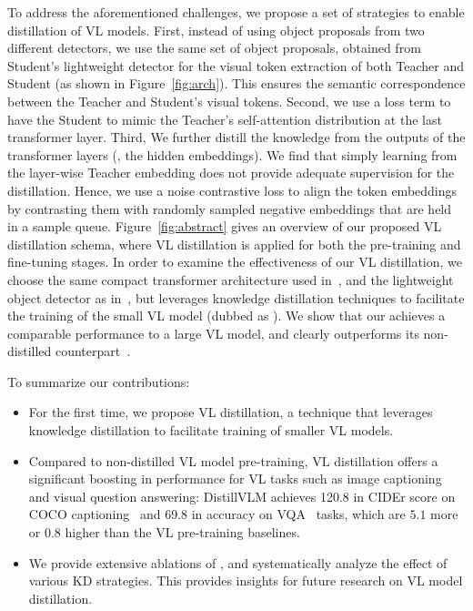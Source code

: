 To address the aforementioned challenges, we propose a set of strategies to enable distillation of VL models. First, instead of using object proposals from two different detectors, we use the same set of object proposals, obtained from Student's lightweight detector for the visual token extraction of both Teacher and Student (as shown in Figure~\ref{fig:arch}). This ensures the semantic correspondence between the Teacher and Student's visual tokens. Second, we use a loss term to have the Student to mimic the Teacher's self-attention distribution at the last transformer layer. Third, We further distill the knowledge from the outputs of the transformer layers (\ie, the hidden embeddings). We find that simply learning from the layer-wise Teacher embedding does not provide adequate supervision for the  distillation. Hence, we use a noise contrastive loss to align the token embeddings by contrasting them with randomly sampled negative embeddings that are held in a sample queue. 
Figure~\ref{fig:abstract} gives an overview of our proposed VL distillation schema, where VL distillation is applied for both the pre-training and fine-tuning stages.
In order to examine the effectiveness of our VL distillation, we 
choose the same compact transformer architecture used in~\cite{wang2020minilm,wang2020minivlm}, and the lightweight object detector as in~\cite{wang2020minivlm}, but leverages knowledge distillation techniques to facilitate the training of the small VL model (dubbed as \distillvlm). 
We show that our \distillvlm achieves a comparable performance to a large VL model, and clearly outperforms its non-distilled counterpart~\cite{wang2020minivlm}.

To summarize our contributions:  \\ [-2.5ex]
\begin{itemize}[noitemsep,nosep]
    \item For the first time, we propose VL distillation, a technique that leverages knowledge distillation to facilitate training of smaller VL models. \\ [-1.7ex]
    \item Compared to non-distilled VL model pre-training, VL distillation offers a significant boosting in performance for VL tasks such as image captioning and visual question answering: DistillV{\small L}M achieves 120.8 in  CIDEr score on COCO captioning~\cite{lin2014microsoft} and 69.8 in accuracy on VQA~\cite{balanced_vqa_v2} tasks, which are $5.1$ more or $0.8$ higher than the VL pre-training baselines.\\ [-1.7ex]
    \item We provide extensive ablations of \distillvlm, and systematically analyze the effect of various KD strategies.
    This provides insights for future research on VL model distillation.
\end{itemize}



